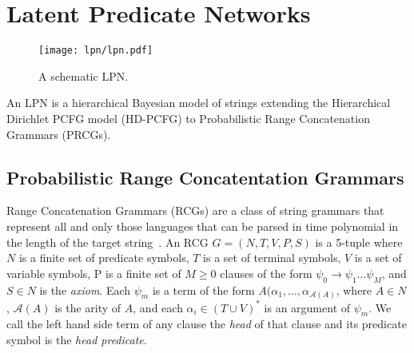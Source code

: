 \documentclass[10pt, twocolumn]{article}
\begin{document}

\section{Latent Predicate Networks}

\begin{figure}[t]
		\texttt{[image: lpn/lpn.pdf]}
		\caption{A schematic LPN.}
		\label{fig:architecture}
\end{figure}

An LPN is a hierarchical Bayesian model of strings
extending the Hierarchical Dirichlet PCFG model (HD-PCFG) to
Probabilistic Range Concatenation Grammars (PRCGs). 

\subsection{Probabilistic Range Concatentation Grammars}
Range Concatenation Grammars (RCGs) are a class of string grammars
that represent all and only those languages that can be parsed in time
polynomial in the length of the target
string~\cite{boullier2005range}. An RCG $G=(N, T, V, P, S)$ is a
5-tuple where $N$ is a finite set of predicate symbols, $T$ is a set
of terminal symbols, $V$ is a set of variable symbols, P is a finite
set of $M \geq 0$ clauses of the form $\psi_0 \rightarrow \psi_1 \dots
\psi_M$, and $S \in N$ is the \emph{axiom}. Each $\psi_m$ is a term of
the form $A(\alpha_1, \dots, \alpha_{\mathcal{A}(A)}$, where $A \in
N$, $\mathcal{A}(A)$ is the arity of $A$, and each $\alpha_i \in (T
\cup V)^*$ is an argument of $\psi_m$. We call the left hand side term
of any clause the \emph{head} of that clause and its predicate symbol
is the \emph{head predicate}.

\end{document}
